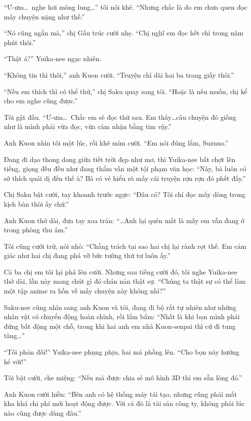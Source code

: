 \documentclass[../main.tex]{subfiles}
\begin{document}
``Ư-ưm\dots\ nghe hơi mông lung\dots'' tôi nói khẽ. ``Nhưng chắc là do em chưa quen đọc mấy chuyện nặng như thế.''

``Nó cũng ngắn mà,'' chị Gấu trúc cười nhẹ. ``Chị nghĩ em đọc hết chỉ trong năm phút thôi.''

``Thật á?'' Yuika-nee ngạc nhiên.

``Không tin thì thôi,'' anh Kuon cười. ``Truyện chỉ dài hai ba trang giấy thôi.''

``Nếu em thích thì có thể thử,'' chị Saku quay sang tôi. ``Hoặc là nếu muốn, chị kể cho em nghe cũng được.''

Tôi gật đầu. ``Ư-ưm\dots\ Chắc em sẽ đọc thử sau. Em thấy\dots câu chuyện đó giống như là mình phải vừa đọc, vừa cảm nhận bằng tim vậy.''

Anh Kuon nhìn tôi một lúc, rồi khẽ mỉm cười. ``Em nói đúng lắm, Suzuno.''

\ct

Đang đi dạo thong dong giữa tiết trời đẹp như mơ, thì Yuika-nee bất chợt lên tiếng, giọng đều đều như đang thẩm vấn một tội phạm văn học: ``Này, bà luôn có sở thích quái dị đến thế à? Bà có vẻ hiểu rõ mấy cái truyện rợn rợn đó phết đấy.''

Chị Saku bật cười, tay khoanh trước ngực: ``Đâu có? Tôi chỉ đọc mấy dòng trong kịch bản thôi ấy chứ.''

Anh Kuon thở dài, đưa tay xoa trán: ``\dots Anh lại quên mất là mấy em vẫn đang ở trong phòng thu âm.''

Tôi cũng cười trừ, nói nhỏ: ``Chẳng trách tại sao hai chị lại rành rọt thế. Em cảm giác như hai chị đang phá vỡ bức tường thứ tư luôn ấy.''

Cả ba chị em tôi lại phá lên cười. Nhưng sau tiếng cười đó, tôi nghe Yuika-nee thở dài, lần này mang chút gì đó chán nản thật sự. ``Chúng ta thật sự có thể làm một tập anime ra hồn về mấy chuyện này không nhỉ?''

Saku-nee cũng nhìn sang anh Kuon và tôi, đang đi bộ rất tự nhiên như những nhân vật có chuyển động hoàn chỉnh, rồi lẩm bẩm: ``Nhất là khi bọn mình phải đứng bất động một chỗ, trong khi hai anh em nhà Kuon-senpai thì cứ đi tung tăng\dots''

``Tôi phản đối!'' Yuika-nee phụng phịu, hai má phồng lên. ``Cho bọn này hưởng ké với!''

Tôi bật cười, che miệng: ``Nếu mà được chia sẻ mô hình 3D thì em sẵn lòng đó.''

Anh Kuon cười hiền: ``Bên anh có hệ thống máy tái tạo, nhưng cũng phải mất kha khá chi phí mới hoạt động được. Với cả đó là tài sản công ty, không phải lúc nào cũng được dùng đâu.''
\end{document}
